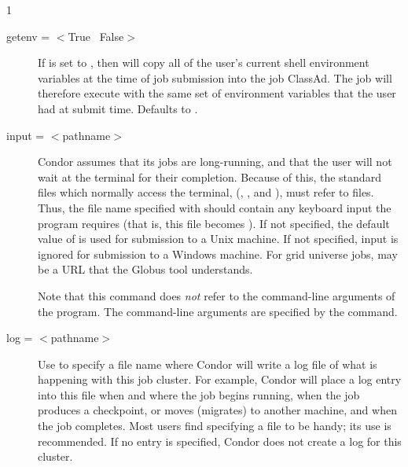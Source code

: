 \begin{ManPage}{\label{man-condor-submit}}{1}
\begin{description}

\item[getenv = $<$True \Bar\ False$>$] If  is set to
, then  will copy all of the user's current
shell environment variables at the time of job submission into the job
ClassAd. The job will therefore execute with the same set of environment
variables that the user had at submit time. Defaults to .



\item[input = $<$pathname$>$]
Condor assumes that its jobs are
long-running, and that the user will not wait at the terminal for their
completion. Because of this, the standard files which normally access
the terminal, (, , and ),
must refer to files. Thus,
the file name specified with  should contain any keyboard
input the program requires (that is, this file becomes ).
If not specified, the default value
of  is used for submission to a Unix machine.
If not specified, input is ignored
for submission to a Windows machine.
For grid universe jobs,  may be a URL that the Globus
tool  understands.

Note that this command does \emph{not} refer to the command-line
arguments of the program.  The command-line arguments are specified by
the  command.


\item[log = $<$pathname$>$] Use  to specify a file name where
Condor will write a log file of what is happening with this job cluster.
For example, Condor will place a log entry into this file
when and where the job begins running,
when the job produces a checkpoint, or moves (migrates) to another machine,
and when the job completes.
Most users find specifying a  file to be handy;
its use is recommended. If no  entry is specified, 
Condor does not create a log for this cluster.


\end{description}
\end{ManPage}
